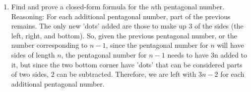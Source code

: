 \documentclass{article}
\begin{document}
\begin{enumerate}
\item Find and prove a closed-form formula for the $n$th pentagonal number. \\
Reasoning: For each additional pentagonal number, part of the previous remains. The only new 'dots' added are those to make up 3 of the sides (the left, right, and bottom). So, given the previous pentagonal number, or the number corresponding to $n-1$, since the pentagonal number for $n$ will have sides of length $n$, the pentagonal number for $n-1$ needs to have 3n added to it, but since the two bottom corner have 'dots' that can be considered parts of two sides, $2$ can be subtracted. Therefore, we are left with $3n-2$ for each additional pentagonal number. 
\end{enumerate}
\end{document}
